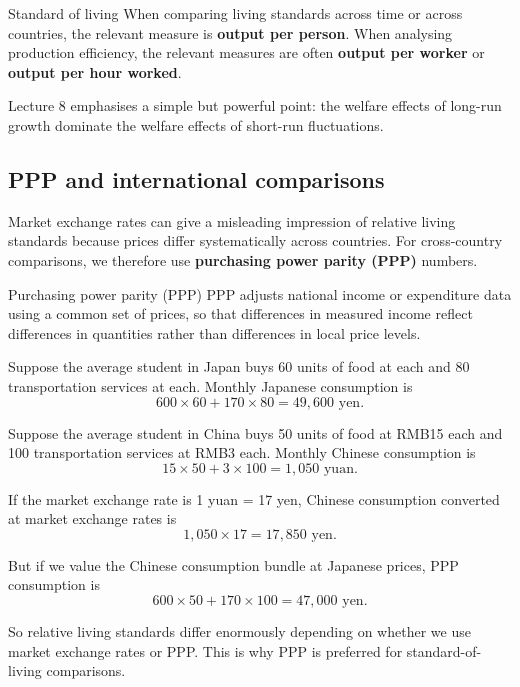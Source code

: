 \documentclass[12pt]{article}
\begin{document}
\begin{definition}{Standard of living}{}
When comparing living standards across time or across countries, the relevant measure is \textbf{output per person}. When analysing production efficiency, the relevant measures are often \textbf{output per worker} or \textbf{output per hour worked}.
\end{definition}

Lecture 8 emphasises a simple but powerful point: the welfare effects of long-run growth dominate the welfare effects of short-run fluctuations.

\subsection{PPP and international comparisons}

Market exchange rates can give a misleading impression of relative living standards because prices differ systematically across countries. For cross-country comparisons, we therefore use \textbf{purchasing power parity (PPP)} numbers.

\begin{definition}{Purchasing power parity (PPP)}{}
PPP adjusts national income or expenditure data using a common set of prices, so that differences in measured income reflect differences in quantities rather than differences in local price levels.
\end{definition}

\begin{examplebox}[title={Worked Example: Exchange-rate comparison versus PPP}]
Suppose the average student in Japan buys 60 units of food at  each and 80 transportation services at  each. Monthly Japanese consumption is
\[
600\times 60 + 170\times 80 = 49{,}600 \text{ yen}.
\]

Suppose the average student in China buys 50 units of food at RMB15 each and 100 transportation services at RMB3 each. Monthly Chinese consumption is
\[
15\times 50 + 3\times 100 = 1{,}050 \text{ yuan}.
\]

If the market exchange rate is 1 yuan = 17 yen, Chinese consumption converted at market exchange rates is
\[
1{,}050\times 17 = 17{,}850 \text{ yen}.
\]

But if we value the Chinese consumption bundle at Japanese prices, PPP consumption is
\[
600\times 50 + 170\times 100 = 47{,}000 \text{ yen}.
\]

So relative living standards differ enormously depending on whether we use market exchange rates or PPP. This is why PPP is preferred for standard-of-living comparisons.
\end{examplebox}
\end{document}
